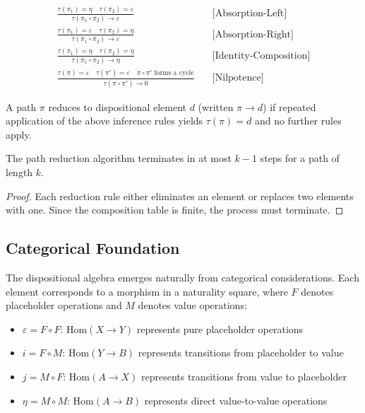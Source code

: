 \documentclass[journal]{IEEEtran}
\begin{document}
\begin{align}
\frac{\tau(\pi_1) = \eta \quad \tau(\pi_2) = \varepsilon}{\tau(\pi_1 \circ \pi_2) \rightarrow \varepsilon} &\quad \text{[Absorption-Left]} \\[0.5em]
\frac{\tau(\pi_1) = \varepsilon \quad \tau(\pi_2) = \eta}{\tau(\pi_1 \circ \pi_2) \rightarrow \varepsilon} &\quad \text{[Absorption-Right]} \\[0.5em]
\frac{\tau(\pi_1) = \eta \quad \tau(\pi_2) = \eta}{\tau(\pi_1 \circ \pi_2) \rightarrow \eta} &\quad \text{[Identity-Composition]} \\[0.5em]
\frac{\tau(\pi) = \varepsilon \quad \tau(\pi') = \varepsilon \quad \pi \circ \pi' \text{ forms a cycle}}{\tau(\pi \circ \pi') \rightarrow 0} &\quad \text{[Nilpotence]}
\end{align}

\begin{definition}
A path $\pi$ reduces to dispositional element $d$ (written $\pi \rightarrow d$) if repeated application of the above inference rules yields $\tau(\pi) = d$ and no further rules apply.
\end{definition}

\begin{theorem}[Termination]
The path reduction algorithm terminates in at most $k-1$ steps for a path of length $k$.
\end{theorem}

\begin{proof}
Each reduction rule either eliminates an element or replaces two elements with one. Since the composition table is finite, the process must terminate.
\end{proof}

\subsection{Categorical Foundation}

The dispositional algebra emerges naturally from categorical considerations. Each element corresponds to a morphism in a naturality square, where $F$ denotes placeholder operations and $M$ denotes value operations:

\begin{itemize}
\item $\varepsilon = F \circ F$: $\text{Hom}(X \to Y)$ represents pure placeholder operations
\item $i = F \circ M$: $\text{Hom}(Y \to B)$ represents transitions from placeholder to value
\item $j = M \circ F$: $\text{Hom}(A \to X)$ represents transitions from value to placeholder  
\item $\eta = M \circ M$: $\text{Hom}(A \to B)$ represents direct value-to-value operations
\end{itemize}
\end{document}
